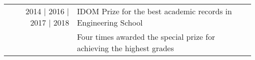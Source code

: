 \documentclass[a4paper,10pt]{article}
\begin{document}
\begin{tabular}{rp{13.6cm}}
2014 | 2016 | 2017 | 2018 & IDOM Prize for the best academic records in Engineering School\\%
&\footnotesize{Four times awarded the special prize for achieving the highest grades} \\
\end{tabular}
\end{document}
